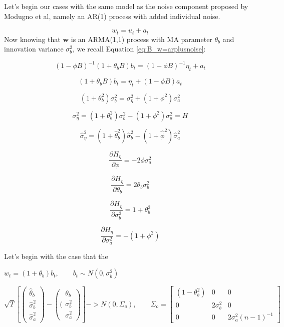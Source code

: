 Let's begin our cases with the same model as the noise component proposed by Modugno et al, namely an AR(1) process with added individual noise.


$$ w_t = u_t + a_t $$
Now knowing that $\mathbf{w}$ is an ARMA(1,1) process with MA parameter $\theta_b$ and innovation variance $\sigma_b^2$, we recall Equation \ref{eq:B_w=arplusnoise}:

$$ (1 - \phi B)^{-1}(1 + \theta_bB)b_t = (1 - \phi B)^{-1} \eta_t + a_t $$

$$ (1 + \theta_bB)b_t = \eta_t + (1 - \phi B)a_t $$

$$ (1 + \theta_b^2)\sigma_b^2 = \sigma_\eta^2 + (1 + \phi^2)\sigma_a^2 $$

$$ {\sigma}_\eta^2 = (1 + {\theta}_b^2){\sigma}_b^2 - (1 + {\phi}^2){\sigma}_a^2 = H $$

$$ \hat{\sigma}_\eta^2 = (1 + \hat{\theta}_b^2)\hat{\sigma}_b^2 - (1 + \hat{\phi}^2)\hat{\sigma}_a^2 $$

$$ \frac{\partial H_\eta}{\partial \phi} = -2\phi\sigma_a^2$$

$$ \frac{\partial H_\eta}{\partial \theta_b} = 2\theta_b\sigma_b^2$$

$$ \frac{\partial H_\eta}{\partial \sigma_b^2} = 1 + \theta_b^2$$

$$ \frac{\partial H_\eta}{\partial \sigma_a^2} = -(1 + \phi^2)$$


Let's begin with the case that the 

$w_t = (1 + \theta_b)b_t, \qquad b_t \sim N(0,\sigma_b^2)$

$$\sqrt{T}\left[\left(\begin{array}{c}
     \hat{\theta}_b \\
      \hat{\sigma}_b^2 \\
      \hat{\sigma}_a^2
\end{array}\right) - \left((\begin{array}{c}
    {\theta}_b \\
      {\sigma}_b^2 \\
     {\sigma}_a^2
\end{array}\right) \right] -> N(0,\Sigma_o),\qquad \Sigma_o = \left[\begin{array}{ccc}
    (1-\theta_b^2) & 0 & 0 \\
    0 & 2\sigma_b^2 & 0 \\
    0 & 0 & 2\sigma_a^2(n-1)^{-1}
\end{array}\right]$$

